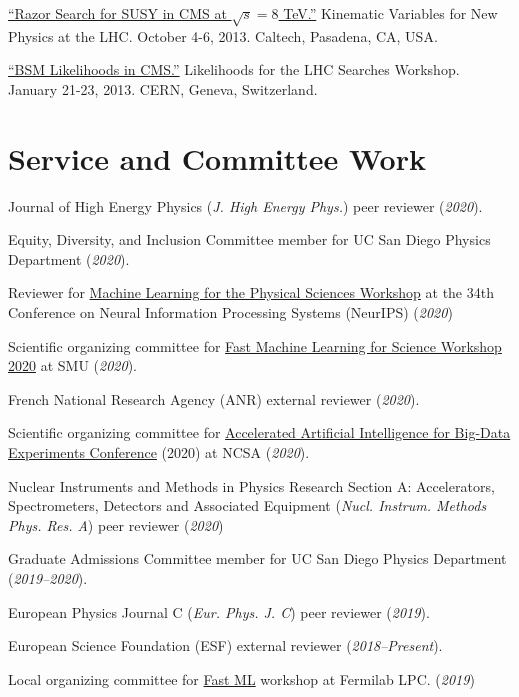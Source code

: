 \documentclass[11pt]{res}
\newcommand{\MarginText}[1]{\section{#1}\vspace{10pt}}
\begin{document}
\begin{resume}
\href{https://indico.cern.ch/event/261650/contributions/586374/}{``Razor
    Search for SUSY in CMS at $\sqrt{s}=8$ TeV.''} Kinematic Variables for
  New Physics at the LHC. October 4-6, 2013. Caltech, Pasadena, CA, USA.

\href{https://indico.cern.ch/event/218693/contributions/1520333/}{``BSM Likelihoods in CMS.''} Likelihoods for
    the LHC Searches Workshop. January 21-23, 2013. CERN, Geneva,
    Switzerland.



\MarginText{Service and Committee Work}

Journal of High Energy Physics (\emph{J. High Energy Phys.}) peer reviewer (\textit{2020}).

Equity, Diversity, and Inclusion Committee member for UC San Diego Physics Department (\textit{2020}).

Reviewer for \href{https://ml4physicalsciences.github.io/2020/}{Machine Learning for the Physical Sciences Workshop} at the 34th Conference on Neural Information Processing Systems (NeurIPS) (\textit{2020})

Scientific organizing committee for \href{https://indico.cern.ch/e/fml2020}{Fast Machine Learning for Science Workshop 2020} at SMU (\textit{2020}).

French National Research Agency (ANR) external reviewer (\textit{2020}).

Scientific organizing committee for \href{http://www.ncsa.illinois.edu/Conferences/AcceleratedAINCSA/}{Accelerated Artificial Intelligence for Big-Data Experiments Conference} (2020) at NCSA (\textit{2020}).

Nuclear Instruments and Methods in Physics Research Section A: Accelerators, Spectrometers, Detectors and Associated Equipment (\emph{Nucl. Instrum. Methods Phys. Res. A}) peer reviewer (\textit{2020})

Graduate Admissions Committee member for UC San Diego Physics Department (\textit{2019--2020}).

European Physics Journal C (\emph{Eur. Phys. J. C}) peer reviewer (\textit{2019}).

European Science Foundation (ESF) external reviewer (\textit{2018--Present}).

Local organizing committee for \href{https://indico.cern.ch/e/fml}{Fast ML} workshop at Fermilab LPC. (\textit{2019})


\end{resume}
\end{document}
